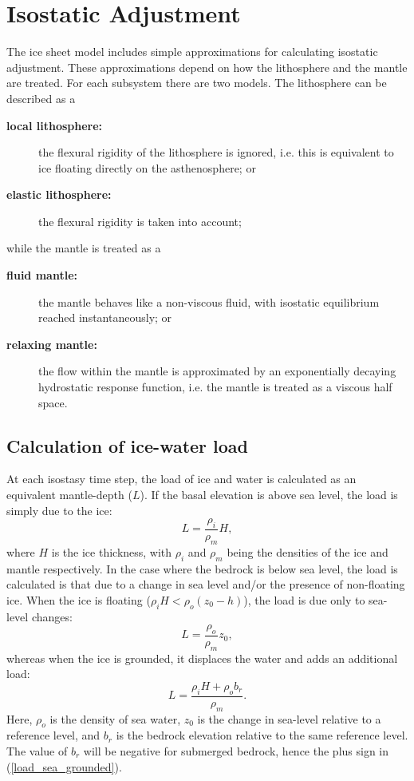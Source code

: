 \section{Isostatic Adjustment}
The ice sheet model includes simple approximations for calculating isostatic adjustment. These approximations depend on how the lithosphere and the mantle are treated. For each subsystem there are two models. The lithosphere can be described as a
\begin{description}
\item[\textbf{local lithosphere:}] the flexural rigidity of the lithosphere is ignored, i.e. this is equivalent to ice floating directly on the asthenosphere; or
\item[\textbf{elastic lithosphere:}] the flexural rigidity is taken into account;
\end{description}
while the mantle is treated as a
\begin{description}
\item [\textbf{fluid mantle:}] the mantle behaves like a non-viscous fluid, with isostatic equilibrium reached instantaneously; or
\item [\textbf{relaxing mantle:}] the flow within the mantle is approximated by an exponentially decaying hydrostatic response function, i.e. the mantle is treated as a viscous half space.
\end{description}

\subsection{Calculation of ice-water load}
At each isostasy time step, the load of ice and water is calculated as an
equivalent mantle-depth ($L$). If the basal elevation is above sea level, the
load is simply due to the ice:
\begin{equation}
L=\frac{\rho_i}{\rho_m}H,
\label{load_land_ice}
\end{equation}
where $H$ is the ice thickness, with $\rho_i$ and $\rho_m$ being the densities
of the ice and mantle respectively. In the case where the bedrock is below
sea level, the load is calculated is that due to a change in sea level and/or
the presence of non-floating ice. When the ice is floating ($\rho_i
H<\rho_o(z_0-h)$), the load is due only to sea-level changes:
\begin{equation}
L=\frac{\rho_o}{\rho_m}z_0,
\label{load_sea_float}
\end{equation}
whereas when the ice is grounded, it displaces the water and adds an
additional load:
\begin{equation}
L=\frac{\rho_i H+\rho_o b_r}{\rho_m}.
\label{load_sea_grounded}
\end{equation}
Here, $\rho_o$ is the density of sea water, $z_0$ is the change in sea-level
relative to a reference level, and $b_r$ is the bedrock elevation relative to the
same reference level. The value of $b_r$ will be negative for submerged bedrock,
hence the plus sign in (\ref{load_sea_grounded}).

